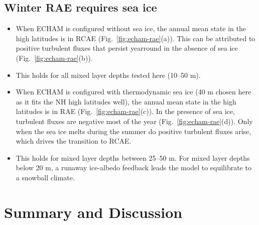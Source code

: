 \documentclass{ametsocV5}
\begin{document}
\subsection{Winter RAE requires sea ice}
\begin{itemize}
  \item When ECHAM is configured without sea ice, the annual mean state in the high latitudes is in RCAE (Fig.~\ref{fig:echam-rae}(a)). This can be attributed to positive turbulent fluxes that persist yearround in the absence of sea ice (Fig.~\ref{fig:echam-rae}(b)).
  \item This holds for all mixed layer depths tested here (10--50 m).
  \item When ECHAM is configured with thermodynamic sea ice (40 m chosen here as it fits the NH high latitudes well), the annual mean state in the high latitudes is in RAE (Fig.~\ref{fig:echam-rae}(c)). In the presence of sea ice, turbulent fluxes are negative most of the year (Fig.~\ref{fig:echam-rae}(d)). Only when the sea ice melts during the summer do positive turbulent fluxes arise, which drives the transition to RCAE.
  \item This holds for mixed layer depths between 25--50 m. For mixed layer depths below 20 m, a runaway ice-albedo feedback leads the model to equilibrate to a snowball climate.
\end{itemize}

\section{Summary and Discussion}
\end{document}
